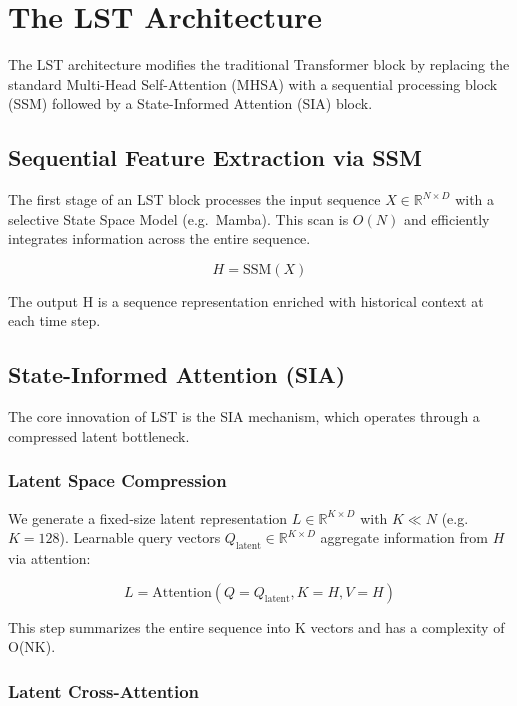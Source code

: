 \documentclass[10pt,twocolumn,letterpaper]{article}
\begin{document}
\section{The LST Architecture}

The LST architecture modifies the traditional Transformer block by replacing the standard Multi-Head Self-Attention (MHSA) with a sequential processing block (SSM) followed by a State-Informed Attention (SIA) block.

\subsection{Sequential Feature Extraction via SSM}

The first stage of an LST block processes the input sequence \(X\in\mathbb{R}^{N\times D}\) with a selective State Space Model (e.g.\ Mamba). This scan is \(O(N)\) and efficiently integrates information across the entire sequence.

\begin{equation}
H = \text{SSM}(X)
\end{equation}

The output H is a sequence representation enriched with historical context at each time step.

\subsection{State-Informed Attention (SIA)}

The core innovation of LST is the SIA mechanism, which operates through a compressed latent bottleneck.

\subsubsection{Latent Space Compression}

We generate a fixed‑size latent representation \(L\in\mathbb{R}^{K\times D}\) with \(K\ll N\) (e.g.\ \(K{=}128\)). Learnable query vectors \(Q_{\text{latent}}\in\mathbb{R}^{K\times D}\) aggregate information from \(H\) via attention:

\begin{equation}
L = \text{Attention}(Q=Q_{\text{latent}}, K=H, V=H)
\end{equation}

This step summarizes the entire sequence into K vectors and has a complexity of O(NK).

\subsubsection{Latent Cross-Attention}
\end{document}
